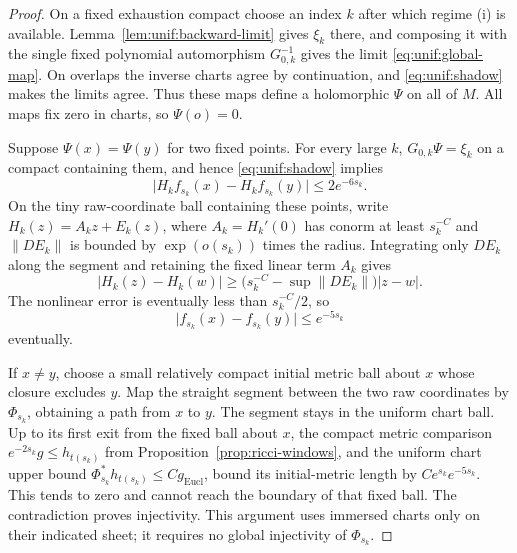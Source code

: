 \documentclass[11pt]{article}
\theoremstyle{definition}
\theoremstyle{remark}
\newcommand{\norm}[1]{\lVert#1\rVert}
\newcommand{\abs}[1]{\lvert#1\rvert}
\numberwithin{equation}{section}
\begin{document}
\begin{proof}
On a fixed exhaustion compact choose an index $k$ after which regime
(i) is available.  Lemma~\ref{lem:unif:backward-limit} gives $\xi_k$
there, and composing it with the single fixed polynomial
automorphism $G_{0,k}^{-1}$ gives the limit
\eqref{eq:unif:global-map}.  On overlaps the inverse charts agree by
continuation, and \eqref{eq:unif:shadow} makes the limits agree.
Thus these maps define a holomorphic $\Psi$ on all of $M$.  All maps
fix zero in charts, so $\Psi(o)=0$.

Suppose $\Psi(x)=\Psi(y)$ for two fixed points.  For every large $k$,
$G_{0,k}\Psi=\xi_k$ on a compact containing them, and hence
\eqref{eq:unif:shadow} implies
\[
 \abs{H_kf_{s_k}(x)-H_kf_{s_k}(y)}\le2e^{-6s_k}.
\]
On the tiny raw-coordinate ball containing these points, write
$H_k(z)=A_kz+E_k(z)$, where $A_k=H_k'(0)$ has conorm at least
$s_k^{-C}$ and $\norm{DE_k}$ is bounded by $\exp(o(s_k))$ times
the radius.  Integrating only $DE_k$ along the segment and retaining
the fixed linear term $A_k$ gives
\[
 |H_k(z)-H_k(w)|\ge
 \bigl(s_k^{-C}-\sup\norm{DE_k}\bigr)|z-w|.
\]
The nonlinear error is eventually less than $s_k^{-C}/2$, so
\begin{equation}
 \abs{f_{s_k}(x)-f_{s_k}(y)}\le e^{-5s_k}
 \label{eq:unif:raw-separation}
\end{equation}
eventually.

If $x\ne y$, choose a small relatively compact initial metric ball
about $x$ whose closure excludes $y$.  Map the straight segment
between the two raw coordinates by $\Phi_{s_k}$, obtaining a path
from $x$ to $y$.  The segment stays in the uniform chart ball.
Up to its first exit from the fixed ball about $x$, the compact
metric comparison $e^{-2s_k}g\le h_{t(s_k)}$ from
Proposition~\ref{prop:ricci-windows}, and the uniform chart upper
bound $\Phi_{s_k}^*h_{t(s_k)}\le Cg_{\mathrm{Eucl}}$, bound its
initial-metric length by
$Ce^{s_k}e^{-5s_k}$.  This tends to zero and cannot reach the
boundary of that fixed ball.  The contradiction proves injectivity.
This argument uses immersed charts only on their indicated sheet;
it requires no global injectivity of $\Phi_{s_k}$.


\end{proof}
\end{document}
